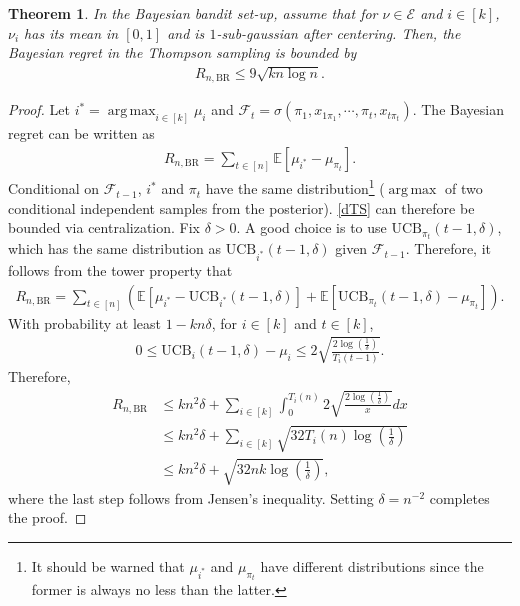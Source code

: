 \documentclass[10pt, openright]{book}
\numberwithin{equation}{section}
\theoremstyle{plain}
\newtheorem{Th}{Theorem}[section]
\theoremstyle{definition}
\def\E{{\mathbb E}}
\def\BR{{\text{BR}}}
\DeclareMathOperator*{\argmax}{arg\,max}
\begin{document}
\begin{Th}
In the Bayesian bandit set-up, assume that for $\nu\in\mathcal E$ and $i\in [k]$, $\nu_i$ has its mean in $[0,1]$ and is $1$-sub-gaussian after centering. Then, the Bayesian regret in the Thompson sampling is bounded by
\begin{align*}
R_{n,\BR}\leq 9\sqrt{kn\log n}. 
\end{align*}
\end{Th}

\begin{proof}
Let $i^*=\argmax_{i\in [k]}\mu_i$ and $\mathcal F_t = \sigma(\pi_1, x_{1\pi_1},\cdots, \pi_t, x_{t\pi_t})$. The Bayesian regret can be written as
\begin{align}
R_{n, \BR} = \sum_{t\in [n]}\E[\mu_{i^*}-\mu_{\pi_t}]. \label{dTS}
\end{align}
Conditional on $\mathcal F_{t-1}$, $i^*$ and $\pi_t$ have the same distribution\footnote{It should be warned that $\mu_{i^*}$ and $\mu_{\pi_t}$ have different distributions since the former is always no less than the latter.} ($\argmax$ of two conditional independent samples from the posterior). \eqref{dTS} can therefore be bounded via centralization. Fix $\delta>0$. A good choice is to use $\text{UCB}_{\pi_t}(t-1,\delta)$, which has the same distribution as $\text{UCB}_{i^*}(t-1,\delta)$ given $\mathcal F_{t-1}$.  Therefore, it follows from the tower property that
\begin{align*}
R_{n, \BR} =  \sum_{t\in [n]}\left(\E[\mu_{i^*}-\text{UCB}_{i^*}(t-1,\delta)]+\E[\text{UCB}_{\pi_t}(t-1,\delta)-\mu_{\pi_t}]\right).
\end{align*}
With probability at least $1-kn\delta$, for $i\in [k]$ and $t\in [k]$,
\begin{align*}
0\leq \text{UCB}_{i}(t-1,\delta)-\mu_{i}\leq 2\sqrt{\frac{2\log\left(\frac{1}{\delta}\right)}{T_i(t-1)}}.
\end{align*}
Therefore,
\begin{align*}
R_{n,\BR}&\leq kn^2\delta + \sum_{i\in [k]}\int_{0}^{T_{i}(n)}2\sqrt{\frac{2\log\left(\frac{1}{\delta}\right)}{x}}dx\\
&\leq kn^2\delta + \sum_{i\in [k]}\sqrt{32T_i(n)\log\left(\frac{1}{\delta}\right)}\\
&\leq kn^2\delta+\sqrt{32nk\log\left(\frac{1}{\delta}\right)},
\end{align*}
where the last step follows from Jensen's inequality. Setting $\delta=n^{-2}$ completes the proof. 
\end{proof}
\end{document}
